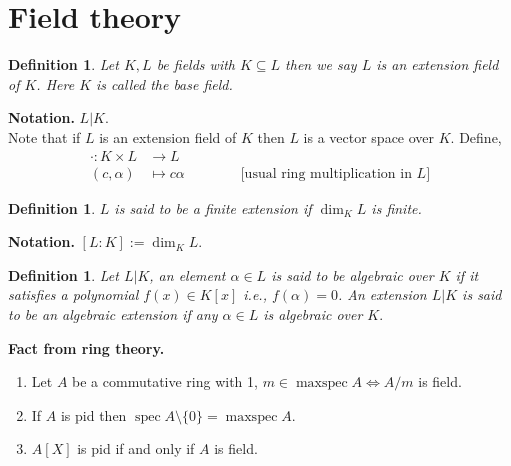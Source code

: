 \documentclass[11pt]{amsart}
\newtheorem{defn}[theorem]{Definition}
\DeclareMathOperator{\spec}{\text{spec}}
\DeclareMathOperator{\mspec}{\text{maxspec}}
\begin{document}
\newpage
\section{Field theory}
\begin{defn}
Let $K,L$ be fields with $K\subseteq L$ then we say $L$ is an extension field of $K$. Here $K$ is called the base field.
\end{defn}
\textbf{Notation.} $L|K.$\\
Note that if $L$ is an extension field of $K$ then $L$ is a vector space over $K$. Define, \begin{align*}
\cdot:K\times L&\to L\\
(c,\alpha)&\mapsto c\alpha\qquad\qquad\text{[usual ring multiplication in $L$]}
\end{align*}
\begin{defn}
$L$ is said to be a finite extension if $\dim_K L$ is finite.
\end{defn}
\textbf{Notation.} $[L:K]:=\dim_K L.$

\begin{defn}
Let $L|K$, an element $\alpha\in L$ is said to be algebraic over $K$ if it satisfies a polynomial $f(x)\in K[x]$ i.e., $f(\alpha)=0$. An extension $L|K$ is said to be an algebraic extension if any $\alpha\in L$ is algebraic over $K.$
\end{defn}
\textbf{Fact from ring theory.} \begin{enumerate}
\item Let $A$ be a commutative ring with 1, $m\in \mspec A\Leftrightarrow A/m$ is field.
\item If $A$ is pid then $\spec A\setminus \{0\}=\mspec A.$
\item $A[X]$ is pid if and only if $A$ is field.
\end{enumerate}
\end{document}
